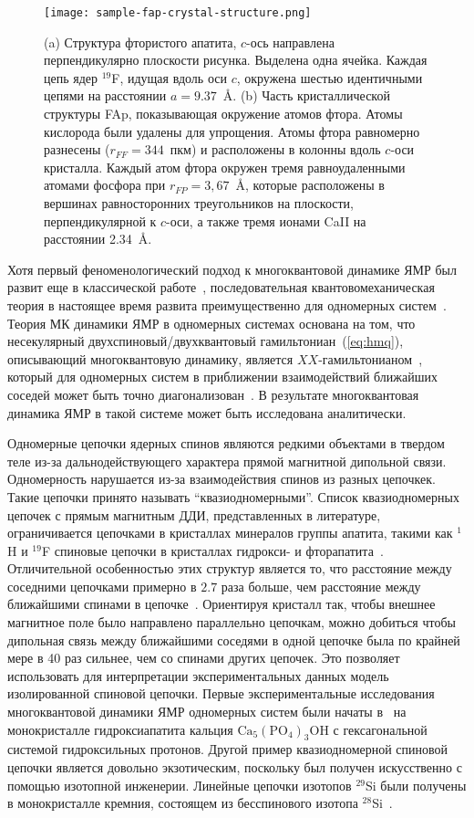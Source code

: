 \begin{figure}[ht]
  \texttt{[image: sample-fap-crystal-structure.png]}
  \caption{
    (a) Структура фтористого апатита, $c$-ось направлена перпендикулярно плоскости рисунка.
    Выделена одна ячейка.
    Каждая цепь ядер $^{19}$F, идущая вдоль оси $c$, окружена шестью идентичными цепями на расстоянии $a=9.37$~\r{A}.
    (b) Часть кристаллической структуры FAp, показывающая окружение атомов фтора. Атомы кислорода были удалены для упрощения.
    Атомы фтора равномерно разнесены ($r_{FF}=344$~пкм) и расположены в колонны вдоль $c$-оси кристалла.
    Каждый атом фтора окружен тремя равноудаленными атомами фосфора при $r_{FP}=3,67$~\r{A},
    которые расположены в вершинах равносторонних треугольников на плоскости,
    перпендикулярной к $c$-оси, а также тремя ионами CaII на расстоянии 2.34~\r{A}.
  }
  \label{fig:sample-fap-crystal-structure}
\end{figure}
Хотя первый феноменологический подход к многоквантовой динамике ЯМР был развит еще в классической работе~\cite{Baum1985},
последовательная квантовомеханическая теория в настоящее время развита преимущественно для одномерных систем~\cite{Feldman1996, Feldman1997, Doronin2000, Feldman2014}.
Теория МК динамики ЯМР в одномерных системах основана на том,
что несекулярный двухспиновый/двухквантовый гамильтониан~(\ref{eq:hmq}),
описывающий многоквантовую динамику,
является $XX$-гамильтонианом~\cite{Landau5},
который для одномерных систем в приближении взаимодействий ближайших соседей может быть точно диагонализован~\cite{Mattis1993}.
В результате многоквантовая динамика ЯМР в такой системе может быть исследована аналитически.

Одномерные цепочки ядерных спинов являются редкими объектами в твердом теле из-за дальнодействующего характера прямой магнитной дипольной связи.
Одномерность нарушается из-за взаимодействия спинов из разных цепочкек.
Такие цепочки принято называть ``квазиодномерными''.
Список квазиодномерных цепочек с прямым магнитным ДДИ,
представленных в литературе,
ограничивается цепочками в кристаллах минералов группы апатита,
такими как $^{1}$H и $^{19}$F спиновые цепочки в кристаллах гидрокси- и фторапатита~\cite{Cho1996}.
Отличительной особенностью этих структур является то,
что расстояние между соседними цепочками примерно в $2.7$ раза больше,
чем расстояние между ближайшими спинами в цепочке~\cite{Cho1996}.
Ориентируя кристалл так,
чтобы внешнее магнитное поле было направлено параллельно цепочкам,
можно добиться чтобы дипольная связь между ближайшими соседями в одной цепочке была по крайней мере в 40 раз сильнее,
чем со спинами других цепочек.
Это позволяет использовать для интерпретации экспериментальных данных модель изолированной спиновой цепочки.
Первые экспериментальные исследования многоквантовой динамики ЯМР одномерных систем были начаты в~\cite{Cho1996, Gatta2012} на монокристалле гидроксиапатита кальция $\mathrm{Ca}_5(\mathrm{PO}_4)_3\mathrm{OH}$ с гексагональной системой гидроксильных протонов.
Другой пример квазиодномерной спиновой цепочки является довольно экзотическим,
поскольку был получен искусственно с помощью изотопной инженерии.
Линейные цепочки изотопов $^{29}$Si были получены в монокристалле кремния, состоящем из бесспинового изотопа $^{28}$Si~\cite{Itoh2005}.

